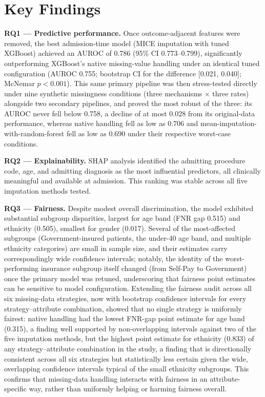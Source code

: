 \documentclass[12pt,a4paper]{report}
\begin{document}
\section{Key Findings}

\textbf{RQ1 --- Predictive performance.} Once outcome-adjacent features were removed, the best admission-time model (MICE imputation with tuned XGBoost) achieved an AUROC of 0.786 (95\% CI 0.773--0.799), significantly outperforming XGBoost's native missing-value handling under an identical tuned configuration (AUROC 0.755; bootstrap CI for the difference [0.021, 0.040]; McNemar $p<0.001$). This same primary pipeline was then stress-tested directly under nine synthetic missingness conditions (three mechanisms $\times$ three rates) alongside two secondary pipelines, and proved the most robust of the three: its AUROC never fell below 0.758, a decline of at most 0.028 from its original-data performance, whereas native handling fell as low as 0.706 and mean-imputation-with-random-forest fell as low as 0.690 under their respective worst-case conditions.

\textbf{RQ2 --- Explainability.} SHAP analysis identified the admitting procedure code, age, and admitting diagnosis as the most influential predictors, all clinically meaningful and available at admission. This ranking was stable across all five imputation methods tested.

\textbf{RQ3 --- Fairness.} Despite modest overall discrimination, the model exhibited substantial subgroup disparities, largest for age band (FNR gap 0.515) and ethnicity (0.505), smallest for gender (0.017). Several of the most-affected subgroups (Government-insured patients, the under-40 age band, and multiple ethnicity categories) are small in sample size, and their estimates carry correspondingly wide confidence intervals; notably, the identity of the worst-performing insurance subgroup itself changed (from Self-Pay to Government) once the primary model was retuned, underscoring that fairness point estimates can be sensitive to model configuration. Extending the fairness audit across all six missing-data strategies, now with bootstrap confidence intervals for every strategy--attribute combination, showed that no single strategy is uniformly fairest: native handling had the lowest FNR-gap point estimate for age band (0.315), a finding well supported by non-overlapping intervals against two of the five imputation methods, but the highest point estimate for ethnicity (0.833) of any strategy--attribute combination in the study, a finding that is directionally consistent across all six strategies but statistically less certain given the wide, overlapping confidence intervals typical of the small ethnicity subgroups. This confirms that missing-data handling interacts with fairness in an attribute-specific way, rather than uniformly helping or harming fairness overall.
\end{document}
